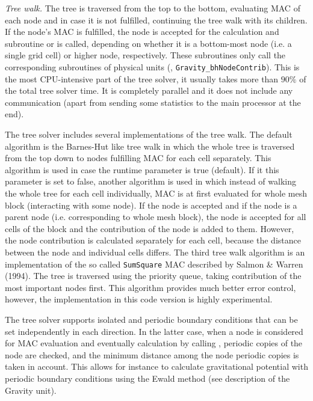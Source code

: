 \textit{Tree walk.} The tree is traversed from the top to the bottom, evaluating
MAC of each node and in case it is not fulfilled, continuing the tree walk with
its children. If the node's MAC is fulfilled, the node is accepted for the
calculation and subroutine  or
 is called, depending on whether it is a bottom-most
node (i.e. a single grid cell) or higher node, respectively. These subroutines
only call the corresponding subroutines of physical units (\eg,
\texttt{Gravity\_bhNodeContrib}). This is the most CPU-intensive part of
the tree solver, it usually takes more than $90\%$ of the total tree solver
time. It is completely parallel and it does not include any communication (apart
from sending some statistics to the main processor at the end).

The tree solver includes several implementations of the tree walk. The default
algorithm is the Barnes-Hut like tree walk in which the whole tree is traversed
from the top down to nodes fulfilling MAC for each cell separately. This
algorithm is used in case the runtime parameter  is
true (default). If it this parameter is set to false, another algorithm is used
in which instead of walking the whole tree for each cell individually, MAC is at
first evaluated for whole mesh block (interacting with some node). If the node
is accepted and if the node is a parent node (i.e. corresponding to whole mesh
block), the node is accepted for all cells of the block and the contribution of
the node is added to them. However, the node contribution is calculated
separately for each cell, because the distance between the node and individual
cells differs. The third tree walk algorithm is an implementation of the so
called \texttt{SumSquare} MAC described by Salmon \& Warren (1994). The tree is
traversed using the priority queue, taking contribution of the most important
nodes first. This algorithm provides much better error control, however, the
implementation in this code version is highly experimental.

The tree solver supports isolated and periodic boundary conditions that can be
set independently in each direction. In the latter case, when a node is
considered for MAC evaluation and eventually calculation by calling
, periodic copies of the
node are checked, and the minimum distance among the node periodic copies is
taken in account. This allows for instance to calculate gravitational potential
with periodic boundary conditions using the Ewald method (see description of the
Gravity unit).


